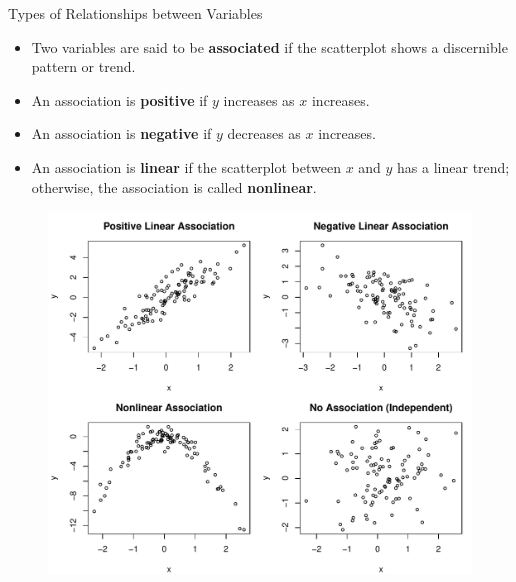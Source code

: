 \documentclass[10pt]{beamer}
\begin{document}
\begin{frame}{Types of Relationships between Variables}
\begin{itemize}
\item Two variables are said to be \textbf{associated} if the scatterplot shows a discernible pattern or trend.
\vspace{5pt}
\item An association is \textbf{positive} if $y$ increases as $x$ increases.
\vspace{5pt}
\item An association is \textbf{negative} if $y$ decreases as $x$ increases.
\vspace{5pt}
\item An association is \textbf{linear} if the scatterplot between $x$ and $y$ has a linear trend; otherwise, the association is called \textbf{nonlinear}. 
\end{itemize}
\end{frame}

\begin{frame}
\centering
\begin{figure}
\includegraphics[scale=0.5]{figure/associations.pdf}
\end{figure}
\end{frame}
\end{document}
